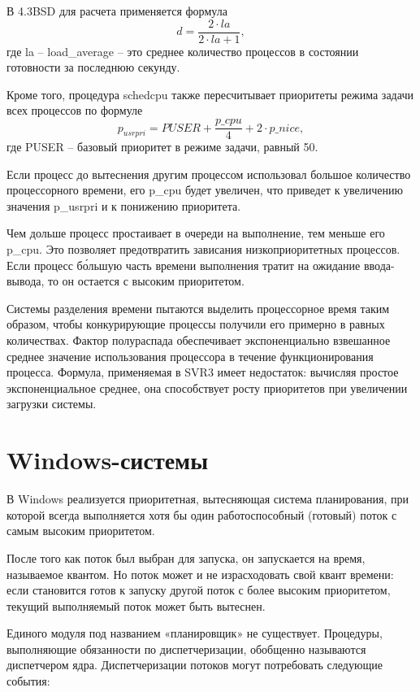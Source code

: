 В {\ttfamily 4.3BSD} для расчета применяется формула
\[
d = \frac{2\cdot la}{2\cdot la + 1},
\]
где {\ttfamily la} -- {\ttfamily load{\_}average} -- это среднее количество процессов в состоянии готовности за последнюю секунду.

Кроме того, процедура {\ttfamily schedcpu} также пересчитывает приоритеты режима задачи всех процессов по формуле
\[
{p_{usrpri}} = PUSER + \frac{p{\_}cpu}{4} + 2\cdot {p{\_}nice},
\]
где {\ttfamily PUSER} -- базовый приоритет в режиме задачи, равный 50.

Если процесс до вытеснения другим процессом использовал большое количество процессорного времени, его {\ttfamily p{\_}cpu} будет увеличен, что приведет к увеличению значения {\ttfamily p{\_}usrpri} и к понижению приоритета.

Чем дольше процесс простаивает в очереди на выполнение, тем меньше его {\ttfamily p{\_}cpu}. Это позволяет предотвратить зависания низкоприоритетных процессов. Если процесс б\'{о}льшую часть времени выполнения тратит на ожидание ввода-вывода, то он остается с высоким приоритетом.

Системы разделения времени пытаются выделить процессорное время таким образом, чтобы конкурирующие процессы получили его примерно в равных количествах. Фактор полураспада обеспечивает экспоненциально взвешанное среднее значение использования процессора в течение функционирования процесса. Формула, применяемая в SVR3 имеет недостаток: вычисляя простое экспоненциальное среднее, она способствует росту приоритетов при увеличении загрузки системы.

\section{Windows-системы}
В Windows реализуется приоритетная, вытесняющая система планирования, при  которой всегда выполняется хотя бы один работоспособный (готовый) поток с самым высоким приоритетом. 

После того как поток был выбран для запуска, он запускается на время, называемое квантом. Но поток может и не израсходовать свой квант времени: если становится готов к запуску другой поток с более высоким приоритетом, текущий выполняемый поток может быть вытеснен.

Единого модуля под названием «планировщик» не существует. Процедуры, выполняющие обязанности по диспетчеризации, обобщенно называются диспетчером ядра.   Диспетчеризации потоков могут потребовать следующие события:

